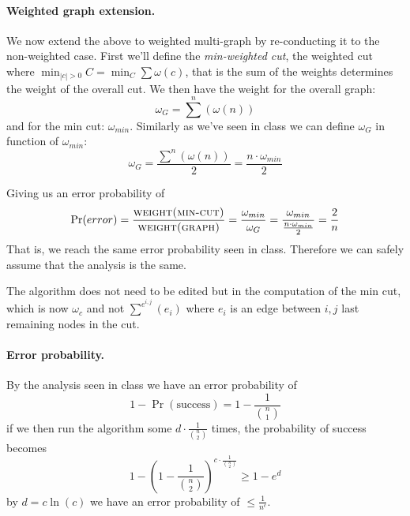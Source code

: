 \paragraph{Weighted graph extension.}
We now extend the above to weighted multi-graph by re-conducting it to the non-weighted case.
First we'll define the \emph{min-weighted cut}, the weighted cut where $\min_{|c| > 0} C = \min_{C} \sum{\omega(c)}$, that is the sum of the weights determines the weight of the overall cut.
We then have the weight for the overall graph: 
\begin{equation*}
\omega_G = \sum^{n}\left( \omega(n) \right)
\end{equation*}
and for the min cut: $\omega_{min}$.
Similarly as we've seen in class we can define $\omega_G$ in function of $\omega_{min}$:
\begin{equation*}
\omega_G = \frac{\sum^{n} \left( \omega(n) \right)}{2} = \frac{n \cdot \omega_{min}}{2}
\end{equation*}

Giving us an error probability of
\begin{equation*}
\Pr(error) = \frac{\textsc{weight(min-cut)}}{\textsc{weight(graph)}} = \frac{\omega_{min}}{\omega_G} = \frac{\omega_{min}}{\frac{n \cdot \omega_{min}}{2}} = \frac{2}{n}
\end{equation*}
That is, we reach the same error probability seen in class.
Therefore we can safely assume that the analysis is the same.

The algorithm does not need to be edited but in the computation of the min cut, which is now $\omega_c$ and not $\sum^{e^{i, j}} \left( e_i \right)$ where $e_i$ is an edge between $i, j$ last remaining nodes in the cut.

\paragraph{Error probability.}
By the analysis seen in class we have an error probability of
\begin{equation*}
1 - \Pr({\text{success}}) = 1 - \frac{1}{{{n} \choose {1}}}
\end{equation*}
if we then run the algorithm some $d \cdot \frac{1}{{{n} \choose {2}}}$ times, the probability of success becomes
\begin{equation*}
1 - \left(1 - \frac{1}{{{n} \choose {2}}} \right)^{c \cdot \frac{1}{{{n} \choose {2}}}} \geq 1 - e^{d}
\end{equation*}
by $d = c \ln(c)$ we have an error probability of $\leq \frac{1}{n^c}$.